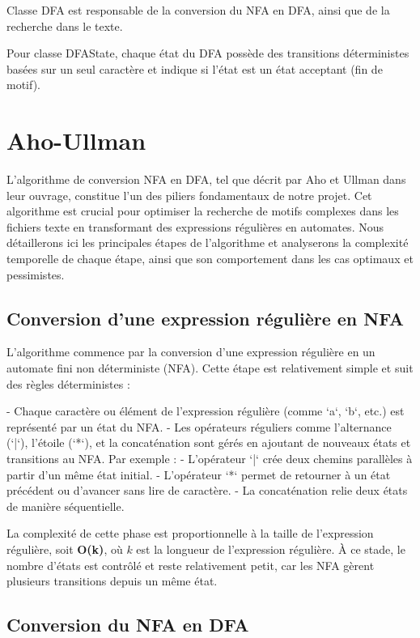\documentclass[11pt,english]{article}
\begin{document}
Classe DFA est responsable de la conversion du NFA en DFA, ainsi que de la recherche dans le texte.

\indent Pour classe DFAState, chaque état du DFA possède des transitions déterministes basées sur un seul caractère et indique si l'état est un état acceptant (fin de motif).



\section{Aho-Ullman}

\indent

L'algorithme de conversion NFA en DFA, tel que décrit par Aho et Ullman dans leur ouvrage, constitue l'un des piliers fondamentaux de notre projet. Cet algorithme est crucial pour optimiser la recherche de motifs complexes dans les fichiers texte en transformant des expressions régulières en automates. Nous détaillerons ici les principales étapes de l'algorithme et analyserons la complexité temporelle de chaque étape, ainsi que son comportement dans les cas optimaux et pessimistes.

\subsection{Conversion d'une expression régulière en NFA}

L'algorithme commence par la conversion d'une expression régulière en un automate fini non déterministe (NFA). Cette étape est relativement simple et suit des règles déterministes :

- Chaque caractère ou élément de l'expression régulière (comme `a`, `b`, etc.) est représenté par un état du NFA.
- Les opérateurs réguliers comme l'alternance (`|`), l'étoile (`*`), et la concaténation sont gérés en ajoutant de nouveaux états et transitions au NFA. Par exemple :
    - L'opérateur `|` crée deux chemins parallèles à partir d'un même état initial.
    - L'opérateur `*` permet de retourner à un état précédent ou d'avancer sans lire de caractère.
    - La concaténation relie deux états de manière séquentielle.
  
La complexité de cette phase est proportionnelle à la taille de l'expression régulière, soit \textbf{O(k)}, où $k$ est la longueur de l'expression régulière. À ce stade, le nombre d'états est contrôlé et reste relativement petit, car les NFA gèrent plusieurs transitions depuis un même état.

\subsection{Conversion du NFA en DFA}
\end{document}
